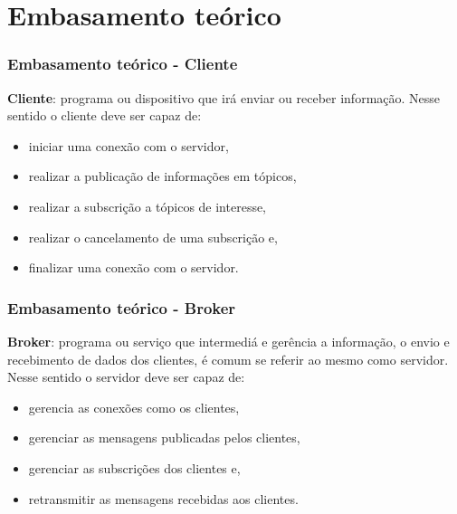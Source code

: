 \documentclass[12pt]{beamer}
\begin{document}
\section{Embasamento teórico}\label{Embasamento teórico}

\begin{frame}[allowframebreaks]
    \frametitle{Embasamento teórico - Cliente}
    
    \textbf{Cliente}: programa ou dispositivo que irá enviar ou receber informação. Nesse sentido o cliente deve ser capaz de:
    \begin{itemize}
        \item iniciar uma conexão com o servidor,
        \item realizar a publicação de informações em tópicos,
        \item realizar a subscrição a tópicos de interesse,
        \item realizar o cancelamento de uma subscrição e,
        \item finalizar uma conexão com o servidor.
    \end{itemize}
    
\end{frame}

\begin{frame}[allowframebreaks]
    \frametitle{Embasamento teórico - Broker}
    
    \textbf{Broker}: programa ou serviço que intermediá e gerência a informação, o envio e recebimento de dados dos clientes, é comum se referir ao mesmo como servidor. Nesse sentido o servidor deve ser capaz de:
    \begin{itemize}
        \item gerencia as conexões como os clientes,
        \item gerenciar as mensagens publicadas pelos clientes,
        \item gerenciar as subscrições dos clientes e,
        \item retransmitir as mensagens recebidas aos clientes.
    \end{itemize}
    
\end{frame}
\end{document}
